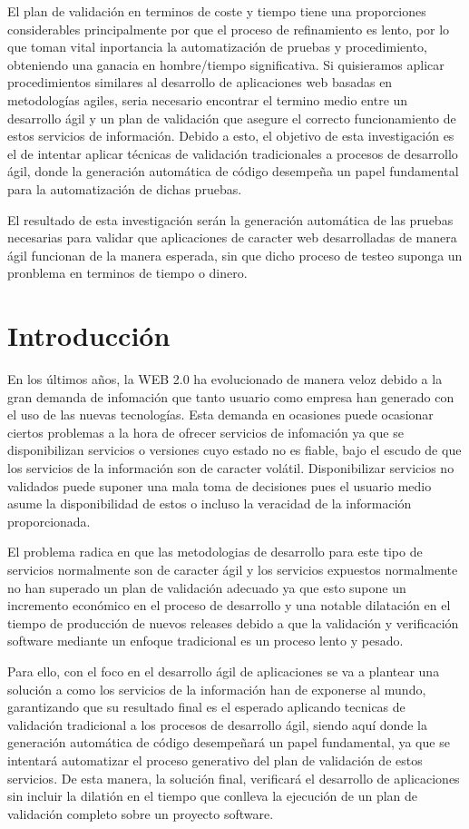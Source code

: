 \documentclass[a4paper,11pt]{book}
\begin{document}
El plan de validación en terminos de coste y tiempo tiene una proporciones considerables principalmente por que el proceso de refinamiento es lento, por lo que toman vital inportancia la automatización de pruebas y procedimiento, obteniendo una ganacia en hombre/tiempo significativa. Si quisieramos aplicar procedimientos similares al desarrollo de aplicaciones web basadas en metodologías agiles, seria necesario encontrar el termino medio entre un desarrollo ágil y un plan de validación que asegure el correcto funcionamiento de estos servicios de información. Debido a esto, el objetivo de esta investigación es el de intentar aplicar técnicas de validación tradicionales a procesos de desarrollo ágil, donde la generación automática de código desempeña un papel fundamental para la automatización de dichas pruebas. 

El resultado de esta investigación serán la generación automática de las pruebas necesarias para validar que aplicaciones de caracter web desarrolladas de manera ágil funcionan de la manera esperada, sin que dicho proceso de testeo suponga un pronblema en terminos de tiempo o dinero.  
 

\chapter{Introducción}

En los últimos años, la WEB 2.0 ha evolucionado de manera veloz debido a la gran demanda de infomación que tanto usuario como empresa han generado con el uso de las nuevas tecnologías. Esta demanda en ocasiones puede ocasionar ciertos problemas a la hora de ofrecer servicios de infomación ya que se disponibilizan servicios o versiones cuyo estado no es fiable, bajo el escudo de que los servicios de la información son de caracter volátil. Disponibilizar servicios no validados puede suponer una mala toma de decisiones pues el usuario medio asume la disponibilidad de estos o incluso la veracidad de la información proporcionada. 

El problema radica en que las metodologias de desarrollo para este tipo de servicios normalmente son de caracter ágil y los servicios expuestos normalmente no han superado un plan de validación adecuado ya que esto supone un incremento económico en el proceso de desarrollo y una notable dilatación en el tiempo de producción de nuevos releases debido a que la validación y verificación software mediante un enfoque tradicional es un proceso lento y pesado.

Para ello, con el foco en el desarrollo ágil de aplicaciones se va a plantear una solución a como los servicios de la información han de exponerse al mundo, garantizando que su resultado final es el esperado aplicando tecnicas de validación tradicional a los procesos de desarrollo ágil, siendo aquí donde la generación automática de código desempeñará un papel fundamental, ya que se intentará automatizar el proceso generativo del plan de validación de estos servicios. De esta manera, la solución final, verificará el desarrollo de aplicaciones sin incluir la dilatión en el tiempo que conlleva la ejecución de un plan de validación completo sobre un proyecto software.    
\end{document}
